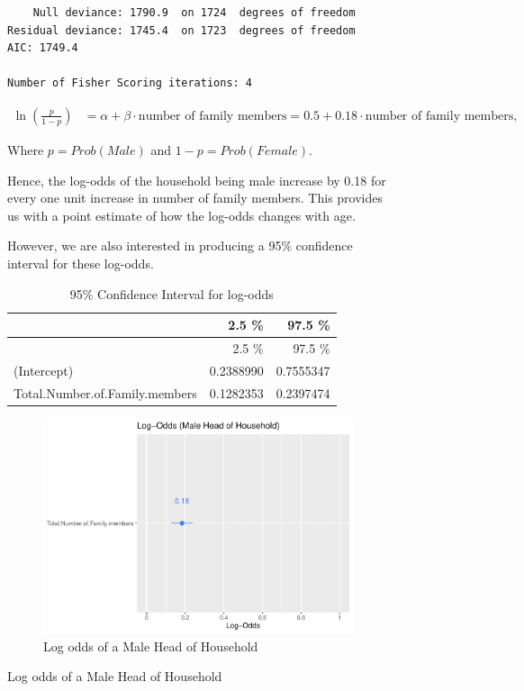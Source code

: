 \documentclass[
]{article}
\begin{document}
\begin{figure}[H]
\begin{verbatim}
    Null deviance: 1790.9  on 1724  degrees of freedom
Residual deviance: 1745.4  on 1723  degrees of freedom
AIC: 1749.4

Number of Fisher Scoring iterations: 4
\end{verbatim}

\begin{align} \ln\left(\frac{p}{1-p}\right) &= \alpha + \beta \cdot \textrm{number of family members} = 0.5 + 0.18 \cdot 
\textrm{number of family members}, \nonumber \end{align}

Where \(p = Prob(Male)\) and \(1-p = Prob(Female)\).

Hence, the log-odds of the household being male increase by 0.18 for
every one unit increase in number of family members. This provides us
with a point estimate of how the log-odds changes with age.

However, we are also interested in producing a 95\% confidence interval
for these log-odds.

\begin{longtable}[]{@{}lrr@{}}
\caption{95\% Confidence Interval for log-odds}\tabularnewline
\toprule
& 2.5 \% & 97.5 \%\tabularnewline
\midrule
\endfirsthead
\toprule
& 2.5 \% & 97.5 \%\tabularnewline
\midrule
\endhead
(Intercept) & 0.2388990 & 0.7555347\tabularnewline
Total.Number.of.Family.members & 0.1282353 & 0.2397474\tabularnewline
\bottomrule
\end{longtable}

\begin{figure}[H]

{\centering \includegraphics[width=0.8\linewidth]{Group_01_Project2_demo_files/figure-latex/plot of model-1} 

}

\caption{Log odds of a Male Head of Household}\label{fig:plot of model}
\end{figure}


\end{figure}
\end{document}
